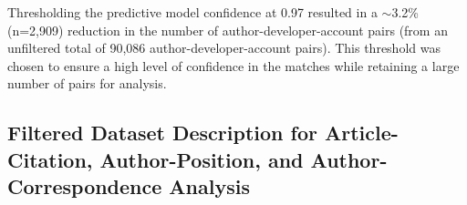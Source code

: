 \documentclass[
  letterpaper,
  DIV=11,
  numbers=noendperiod]{scrartcl}
\begin{document}
Thresholding the predictive model confidence at 0.97 resulted in a
$\sim$3.2\% (n=2,909) reduction in the number of
author-developer-account pairs (from an unfiltered total of 90,086
author-developer-account pairs). This threshold was chosen to ensure a
high level of confidence in the matches while retaining a large number
of pairs for analysis.

\subsection{Filtered Dataset Description for Article-Citation,
Author-Position, and Author-Correspondence
Analysis}\label{filtered-dataset-description-for-article-citation-author-position-and-author-correspondence-analysis}

\begin{table}

\caption{\label{tbl-team-comp-no-push-after-pub-counts}Counts of article-repository pairs, authors, and developers for research teams. Only includes research teams from article-repository pairs with a most recent commit no later than 90 days after publication and excludes research teams in the top 3\% of total author sizes.}

\centering{

    \centering
    \small
    
}
\end{table}
\end{document}
